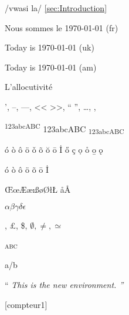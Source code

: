 \documentclass[a4paper,12pt]{article}%
\newcommand{\motclef}[1]{\textsc{#1}}
\newcommand{\oubien}[2]{#1/#2}
\newenvironment{newitshape}{``\itshape}{''}
\begin{document}
/vwasi la/ \cref{sec:Introduction}

Nous sommes le {\today} (fr)

Today is \textenglish[variant=uk]{\today} (uk) 

\begin{english}
Today is {\today} (am)
\end{english}


L'al\-lo\-cu\-ti\-vi\-té


', --, ---, << >>, `` '', \dots, \textexclamdown, \textquestiondown

\textsuperscript{123abcABC} 123abcABC \textsubscript{123abcABC}

\'{o} \`{o} \^{o} \"{o} \v{o} \~{o} \u{o} 
\={o} \.{I} \H{o} \c{c} \d{o} \r{o} \b{o}
\k{o}

\'o \`o \^o \"o \~o \=o \.I

\OE \oe \AE \ae \ij \i \ss \SS \o \O \l \L
\aa \AA \dh \DH \dj \DJ \ng \NG

$\alpha\beta\gamma\delta\epsilon$

\textcopyright, \pounds, \$, \texteuro
\textrightarrow
$\emptyset, \neq, \simeq$

\motclef{abc}

\oubien{a}{b}

\begin{newitshape}
This is the new environment.
\end{newitshape}

[compteur1]





\listoftables
{}
\printindex
\end{document}
